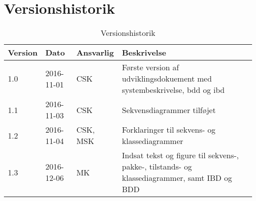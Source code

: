 \chapter{Versionshistorik}\label{Versionshistorik}

\begin{table}[htb]
\begin{tabular}{ | l | l | l | p{} | }
\hline
\textbf{Version} & \textbf{Dato} & \textbf{Ansvarlig} & \textbf{Beskrivelse} \\\hline
1.0 & 2016-11-01 & CSK & Første version af udviklingsdokuement med systembeskrivelse, bdd og ibd\\\hline
1.1 & 2016-11-03 & CSK & Sekvensdiagrammer tilføjet  \\\hline
1.2 & 2016-11-04 & CSK, MSK & Forklaringer til sekvens- og klassediagrammer \\\hline
1.3 & 2016-12-06 & MK & Indsat tekst og figure til sekvens-, pakke-, tilstands- og klassediagrammer, samt IBD og BDD \\\hline
\end{tabular}
\caption{Versionshistorik}
\end{table}